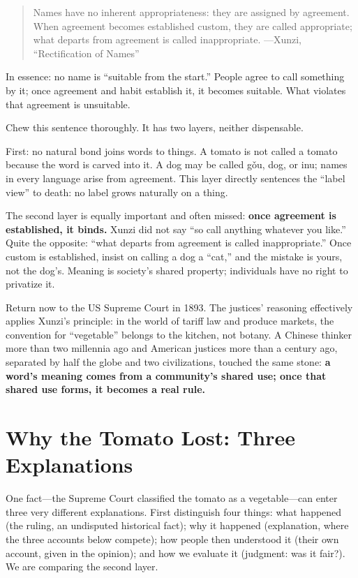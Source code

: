 \begin{quote}
Names have no inherent appropriateness: they are assigned by agreement. When agreement becomes established custom, they are called appropriate; what departs from agreement is called inappropriate. ---Xunzi, ``Rectification of Names''
\end{quote}
In essence: no name is ``suitable from the start.'' People agree to call something by it; once agreement and habit establish it, it becomes suitable. What violates that agreement is unsuitable.

Chew this sentence thoroughly. It has two layers, neither dispensable.

First: no natural bond joins words to things. A tomato is not called a tomato because the word is carved into it. A dog may be called gǒu, dog, or inu; names in every language arise from agreement. This layer directly sentences the ``label view'' to death: no label grows naturally on a thing.

The second layer is equally important and often missed: \textbf{once agreement is established, it binds.} Xunzi did not say ``so call anything whatever you like.'' Quite the opposite: ``what departs from agreement is called inappropriate.'' Once custom is established, insist on calling a dog a ``cat,'' and the mistake is yours, not the dog's. Meaning is society's shared property; individuals have no right to privatize it.

Return now to the US Supreme Court in 1893. The justices' reasoning effectively applies Xunzi's principle: in the world of tariff law and produce markets, the convention for ``vegetable'' belongs to the kitchen, not botany. A Chinese thinker more than two millennia ago and American justices more than a century ago, separated by half the globe and two civilizations, touched the same stone: \textbf{a word's meaning comes from a community's shared use; once that shared use forms, it becomes a real rule.}

\section{Why the Tomato Lost: Three Explanations}
One fact---the Supreme Court classified the tomato as a vegetable---can enter three very different explanations. First distinguish four things: what happened (the ruling, an undisputed historical fact); why it happened (explanation, where the three accounts below compete); how people then understood it (their own account, given in the opinion); and how we evaluate it (judgment: was it fair?). We are comparing the second layer.

